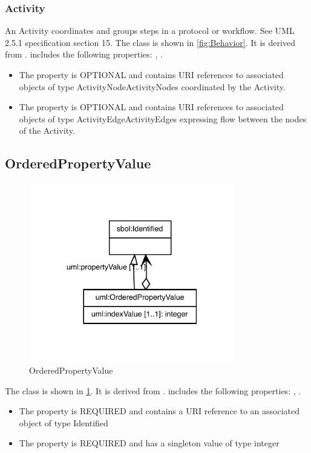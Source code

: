 \subsubsection{Activity}%
\label{sec:uml:Activity}%
An Activity coordinates and groups steps in a protocol or workflow. See UML 2.5.1 specification section 15.%
\linebreak%
\linebreak%
The  class is shown in \ref{fig:Behavior}. It is derived from .%
 includes the following properties: , . %
\begin{itemize}%
\item%
The  property is OPTIONAL and contains URI references to associated objects of type ActivityNodeActivityNodes coordinated by the Activity.%
\item%
The  property is OPTIONAL and contains URI references to associated objects of type ActivityEdgeActivityEdges expressing flow between the nodes of the Activity.%
\end{itemize}%
\subsection{OrderedPropertyValue}%
\label{sec:uml:OrderedPropertyValue}%


\begin{figure}[h!]%
\centering%
\includegraphics[width=0.8\textwidth]{uml_classes/OrderedPropertyValue_abstraction_hierarchy.pdf}%
\caption{OrderedPropertyValue}%
\label{fig:OrderedPropertyValue}%
\end{figure}

%
The  class is shown in \ref{fig:OrderedPropertyValue}. It is derived from .%
 includes the following properties: , . %
\begin{itemize}%
\item%
The  property is REQUIRED and contains a URI reference to an associated object of type Identified%
\item%
The  property is REQUIRED and has a singleton value of type integer%
\end{itemize}%
